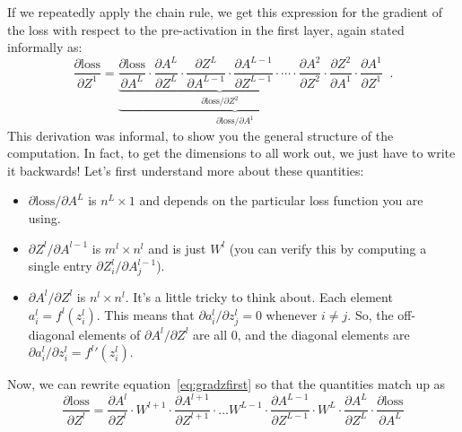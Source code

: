 If we repeatedly apply
the chain rule, we get this expression for the gradient of the loss
with respect to the pre-activation in the first layer, again stated informally as:
\begin{equation}
\label{eq:gradzfirst}
  \frac{\partial \text{loss}}{\partial Z^1} = \underbrace{\underbrace{
  \frac{\partial \text{loss}}{\partial A^L} \cdot
  \frac{\partial A^L}{\partial Z^L} \cdot
  \frac{\partial Z^L}{\partial A^{L-1}} \cdot
  \frac{\partial A^{L-1}}{\partial Z^{L-1}} \cdot \cdots \cdot
  \frac{\partial A^2}{\partial Z^2}}_{\partial \text{loss} / \partial Z^2}
  \cdot \frac{\partial Z^2}{\partial A^1}}
  _{\partial \text{loss} / \partial A^1} \cdot
  \frac{\partial A^1}{\partial Z^1} \;\;.
\end{equation}
This derivation was informal, to show  you the general structure of
the computation.  In fact, to get the dimensions to all work out, we
just have to write it backwards!  Let's first understand more about
these quantities:
\begin{itemize}
\item $\partial \text{loss}/\partial A^L$ is $n^L \times 1$ and
  depends on the particular loss function you are using.
\item $\partial Z^l / \partial A^{l-1}$ is $m^l \times n^l$ and is
  just $W^l$ (you can verify this by computing a single entry
  $\partial Z^l_i / \partial A^{l-1}_j$).
\item $\partial A^l/\partial Z^l$ is $n^l \times n^l$.  It's a little
  tricky to think about.  Each element 
  $a_i^l = f^l(z_i^l)$. 
    This means that $\partial a_i^l / \partial
  z_j^l = 0$ whenever $i \not = j$.  So, the off-diagonal elements of 
  $\partial A^l/\partial Z^l$ are all 0, and the diagonal elements are 
  $\partial a_i^l / \partial  z_i^l = {f^l}'(z_i^l)$.  
\end{itemize}
Now, we can rewrite equation~\ref{eq:gradzfirst} so that the quantities
match up as
\begin{equation}
\label{eq:gradz}
\frac{\partial \text{loss}}{\partial Z^l} = 
\frac{\partial A^l}{\partial Z^l} \cdot 
W^{l+1} \cdot \frac{\partial A^{l+1}}{\partial Z^{l+1}} \cdot \ldots
W^{L-1} \cdot \frac{\partial A^{L-1}}{\partial Z^{L-1}} \cdot 
W^{L} \cdot \frac{\partial A^{L}}{\partial Z^{L}} \cdot
\frac{\partial \text{loss}}{\partial A^L}
\end{equation}

